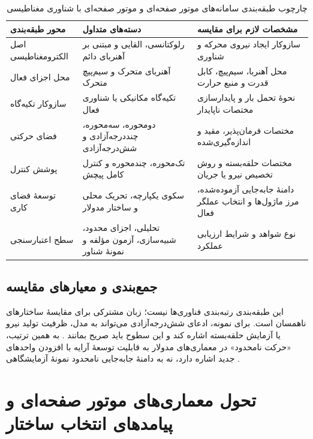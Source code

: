 \begin{table}[htbp]
	\centering
	\caption{چارچوب طبقه‌بندی سامانه‌های موتور صفحه‌ای و موتور صفحه‌ای با شناوری مغناطیسی}
	\label{tab:mlpm_taxonomy}
	\renewcommand{\arraystretch}{1.35}
	\small
	\begin{tabular}{|p{}|p{}|p{}|}
		\hline
		\textbf{محور طبقه‌بندی} & \textbf{دسته‌های متداول} & \textbf{مشخصات لازم برای مقایسه} \\
		\hline
		اصل الکترومغناطیسی & رلوکتانسی، القایی و مبتنی بر آهنربای دائم & سازوکار ایجاد نیروی محرکه و شناوری \\
		\hline
		محل اجزای فعال & آهنربای متحرک و سیم‌پیچ متحرک & محل آهنربا، سیم‌پیچ، کابل قدرت و منبع حرارت \\
		\hline
		سازوکار تکیه‌گاه & تکیه‌گاه مکانیکی یا شناوری فعال & نحوهٔ تحمل بار و پایدارسازی مختصات ناپایدار \\
		\hline
		فضای حرکتی & دومحوره، سه‌محوره، چنددرجه‌آزادی و شش‌درجه‌آزادی & مختصات فرمان‌پذیر، مقید و اندازه‌گیری‌شده \\
		\hline
		پوشش کنترل & تک‌محوره، چندمحوره و کنترل کامل پیچش & مختصات حلقه‌بسته و روش تخصیص نیرو یا جریان \\
		\hline
		توسعهٔ فضای کاری & سکوی یکپارچه، تحریک محلی و ساختار مدولار & دامنهٔ جابه‌جایی آزموده‌شده، مرز ماژول‌ها و انتخاب عملگر فعال \\
		\hline
		سطح اعتبارسنجی & تحلیلی، اجزای محدود، شبیه‌سازی، آزمون مؤلفه و نمونهٔ شناور & نوع شواهد و شرایط ارزیابی عملکرد \\
		\hline
	\end{tabular}
\end{table}

\subsection{جمع‌بندی و معیارهای مقایسه}
\label{subsec:taxonomy_summary}
این طبقه‌بندی رتبه‌بندی فناوری‌ها نیست؛ زبان مشترکی برای مقایسهٔ ساختارهای ناهمسان است. برای نمونه، ادعای شش‌درجه‌آزادی می‌تواند به مدل، ظرفیت تولید نیرو یا آزمایش حلقه‌بسته اشاره کند و این سطوح باید صریح بمانند \cite{hu6DOFExtendedUnified2024,huDynamicModelingApproach2025,j.liHighPrecisionTriaxialContouring2026}. به همین ترتیب، «حرکت نامحدود» در معماری‌های مدولار به قابلیت توسعهٔ آرایه با افزودن واحدهای جدید اشاره دارد، نه به دامنهٔ جابه‌جایی نامحدود نمونهٔ آزمایشگاهی \cite{miyasakaMagneticLevitationUnlimited2014,xuModularMaglevDesign2024d}.


\section{تحول معماری‌های موتور صفحه‌ای و پیامدهای انتخاب ساختار}
\label{subsec:mlpm_architecture}

